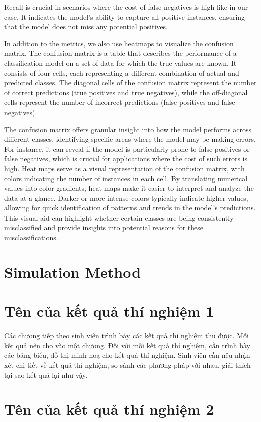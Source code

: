 \documentclass[../main.tex]{subfiles}
\begin{document}
Recall is crucial in scenarios where the cost of false negatives is high like in our case.
It indicates the model's ability to capture all positive instances, ensuring that the model does not miss any potential positives.


In addition to the metrics, we also use heatmaps to visualize the confusion matrix.
The confusion matrix is a table that describes the performance of a classification model on a set of data for which the true values are known.
It consists of four cells, each representing a different combination of actual and predicted classes.
The diagonal cells of the confusion matrix represent the number of correct predictions (true positives and true negatives), while the off-diagonal cells represent the number of incorrect predictions (false positives and false negatives).

The confusion matrix offers granular insight into how the model performs across different classes, identifying specific areas where the model may be making errors.
For instance, it can reveal if the model is particularly prone to false positives or false negatives, which is crucial for applications where the cost of such errors is high.
Heat maps serve as a visual representation of the confusion matrix, with colors indicating the number of instances in each cell.
By translating numerical values into color gradients, heat maps make it easier to interpret and analyze the data at a glance.
Darker or more intense colors typically indicate higher values, allowing for quick identification of patterns and trends in the model's predictions.
This visual aid can highlight whether certain classes are being consistently misclassified and provide insights into potential reasons for these misclassifications.


\section{Simulation Method}


\section{Tên của kết quả thí nghiệm 1}

Các chương tiếp theo sinh viên trình bày các kết quả thí nghiệm thu được. Mỗi kết quả nên cho vào một chương. Đối với mỗi kết quả thí nghiệm, cần trình bày các bảng biểu, đồ thị minh hoạ cho kết quả thí nghiệm. Sinh viên cần nêu nhận xét chi tiết về kết quả thí nghiệm, so sánh các phương pháp với nhau, giải thích tại sao kết quả lại như vậy.

\section{Tên của kết quả thí nghiệm 2}
\end{document}
